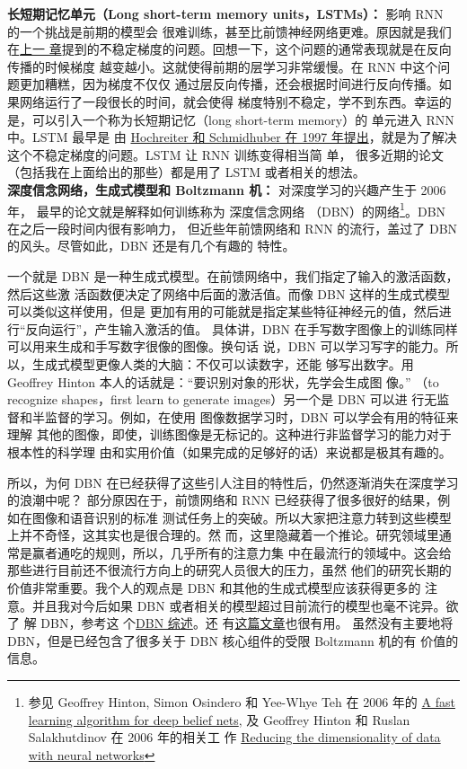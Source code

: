 \textbf{长短期记忆单元（Long short-term memory units，LSTMs）：} 影响 RNN 的一个挑战是前期的模型会
很难训练，甚至比前馈神经网络更难。原因就是我们在\hyperref[ch:WhyHardToTrain]{上一
  章}提到的不稳定梯度的问题。回想一下，这个问题的通常表现就是在反向传播的时候梯度
越变越小。这就使得前期的层学习非常缓慢。在 RNN 中这个问题更加糟糕，因为梯度不仅仅
通过层反向传播，还会根据时间进行反向传播。如果网络运行了一段很长的时间，就会使得
梯度特别不稳定，学不到东西。幸运的是，可以引入一个称为长短期记忆（long short-term memory）的
单元进入 RNN 中。LSTM 最早是
由 \href{http://dx.doi.org/10.1162/neco.1997.9.8.1735}{Hochreiter 和 Schmidhuber
  在 1997 年提出}，就是为了解决这个不稳定梯度的问题。LSTM 让 RNN 训练变得相当简
单，
很多近期的论文（包括我在上面给出的那些）都是用了 LSTM 或者相关的想法。\\

\textbf{深度信念网络，生成式模型和 Boltzmann 机：} 对深度学习的兴趣产生于 2006 年，
最早的论文就是解释如何训练称为 深度信念网络 （DBN）的网络\footnote{参见 Geoffrey
  Hinton, Simon Osindero 和 Yee-Whye
  Teh 在 2006 年的 \href{http://www.cs.toronto.edu/~hinton/absps/fastnc.pdf}{A
    fast learning algorithm for deep belief nets}, 及 Geoffrey Hinton 和 Ruslan
  Salakhutdinov 在 2006 年的相关工
  作 \href{http://www.sciencemag.org/content/313/5786/504.short}{Reducing the
    dimensionality of data with neural networks}}。DBN 在之后一段时间内很有影响力，
但近些年前馈网络和 RNN 的流行，盖过了 DBN 的风头。尽管如此，DBN 还是有几个有趣的
特性。

一个就是 DBN 是一种生成式模型。在前馈网络中，我们指定了输入的激活函数，然后这些激
活函数便决定了网络中后面的激活值。而像 DBN 这样的生成式模型可以类似这样使用，但是
更加有用的可能就是指定某些特征神经元的值，然后进行“反向运行”，产生输入激活的值。
具体讲，DBN 在手写数字图像上的训练同样可以用来生成和手写数字很像的图像。换句话
说，DBN 可以学习写字的能力。所以，生成式模型更像人类的大脑：不仅可以读数字，还能
够写出数字。用 Geoffrey Hinton 本人的话就是：“要识别对象的形状，先学会生成图
像。” （to recognize shapes，first learn to generate images）另一个是 DBN 可以进
行无监督和半监督的学习。例如，在使用 图像数据学习时，DBN 可以学会有用的特征来理解
其他的图像，即使，训练图像是无标记的。这种进行非监督学习的能力对于根本性的科学理
由和实用价值（如果完成的足够好的话）来说都是极其有趣的。

所以，为何 DBN 在已经获得了这些引人注目的特性后，仍然逐渐消失在深度学习的浪潮中呢？
部分原因在于，前馈网络和 RNN 已经获得了很多很好的结果，例如在图像和语音识别的标准
测试任务上的突破。所以大家把注意力转到这些模型上并不奇怪，这其实也是很合理的。然
而，这里隐藏着一个推论。研究领域里通常是赢者通吃的规则，所以，几乎所有的注意力集
中在最流行的领域中。这会给那些进行目前还不很流行方向上的研究人员很大的压力，虽然
他们的研究长期的价值非常重要。我个人的观点是 DBN 和其他的生成式模型应该获得更多的
注意。并且我对今后如果 DBN 或者相关的模型超过目前流行的模型也毫不诧异。欲了
解 DBN，参考这
个\href{http://www.scholarpedia.org/article/Deep_belief_networks}{DBN 综述}。还
有\href{http://www.cs.toronto.edu/~hinton/absps/guideTR.pdf}{这篇文章}也很有用。
虽然没有主要地将 DBN，但是已经包含了很多关于 DBN 核心组件的受限 Boltzmann 机的有
价值的信息。\\

